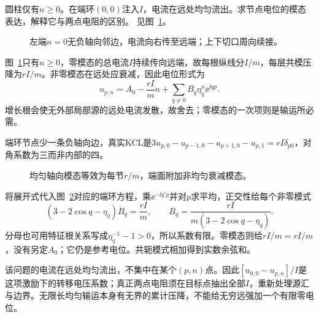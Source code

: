 \begin{example}[半无限端面的单点注流]\label{ex:c4-cylinder-end}
圆柱仅有$n\ge0$。在端环$(0,0)$注入$I$，电流在远处均匀流出。求节点电位的模态表达，解释它与两点电阻的区别。 见图~\ref{fig:c4-cylinder-end-q}。
\end{example}

\begin{figure}[H]\centering
{}
\caption{左端$n=0$无负轴向邻边，电流向右传至远端；上下切口周向续接。}\label{fig:c4-cylinder-end-q}
\end{figure}
\begin{solution}
图~\ref{fig:c4-cylinder-end-q}只有$n\ge0$，零模态的总电流$I$持续传向远端，故每根纵线分$I/m$，每层共模压降为$rI/m$。非零模态在远处应衰减，因此电位形式为
\[
 u_{p,n}=A_0-\frac{rI}mn+\sum_{q\ne0}B_q\eta_q^n\ee^{\ii qp}.
\]
增长根会使无外部局部源的远处电流发散，故舍去；零模态的一次项则是输运所必需。

端环节点少一条负轴向边，真实KCL是$3u_{p,0}-u_{p-1,0}-u_{p+1,0}-u_{p,1}=rI\delta_{p0}$，对角系数为三而非内部的四。
\begin{figure}[H]\centering
{}
\caption{均匀轴向模态等效为每节$r/m$，端面附加非均匀衰减模态。}\label{fig:c4-cylinder-end-s}
\end{figure}
将展开式代入图~\ref{fig:c4-cylinder-end-s}对应的端环方程，乘$\ee^{-\ii q'p}$并对$p$求平均，正交性给每个非零模式
\[
 (3-2\cos q-\eta_q)B_q=\frac{rI}m,
 \qquad\boxed{B_q=\frac{rI}{m(3-2\cos q-\eta_q)}}.
\]
分母也可用特征根关系写成$\eta_q^{-1}-1>0$，所以系数有限。零模态则给$rI/m=rI/m$，没有另定$A_0$；它仍是参考电位。共轭模式相加得到实数余弦和。

该问题的电流在远处均匀流出，不集中在某个$(p,n)$点。因此$[u_{0,0}-u_{p,n}]/I$是这项激励下的转移电压系数；真正两点电阻须在目标点抽出全部$I$，重新处理源汇与边界。无限长均匀输运本身有无界的累计压降，不能给无穷远强加一个有限零电位。
\end{solution}
